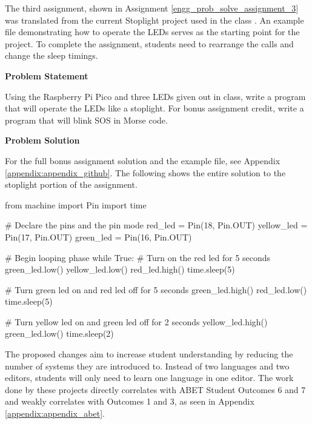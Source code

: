 The third assignment, shown in Assignment \ref{engg_prob_solve_assignment_3} was translated from the 
current Stoplight project used in the class \cite{stoplight}. An example file
demonstrating how to operate the LEDs serves as the starting point for the project. To complete the
assignment, students need to rearrange the  calls and change the sleep timings.

\label{engg_prob_solve_assignment_3}

\begin{tcolorbox}[breakable, enhanced jigsaw, title=DEN 161: Assignment \ref{engg_prob_solve_assignment_3}, 
    colframe=ksu-purple, colback=ksu-gray]

    \textbf{Problem Statement}
    \parindent15pt

    Using the Raspberry Pi Pico and three LEDs given out in class, write a program that will operate
    the LEDs like a stoplight. For bonus assignment credit, write a program that will blink SOS in Morse code.
    
    \tcblower
    \textbf{Problem Solution}
    \parindent15pt
    
    For the full bonus assignment solution and the example file, see Appendix \ref{appendix:appendix_github}. 
    The following shows the entire solution to the stoplight portion of the assignment.

\begin{python}
from machine import Pin
import time

# Declare the pins and the pin mode
red_led = Pin(18, Pin.OUT)
yellow_led = Pin(17, Pin.OUT)
green_led = Pin(16, Pin.OUT)

# Begin looping phase
while True:
    # Turn on the red led for 5 seconds
    green_led.low()
    yellow_led.low()
    red_led.high()
    time.sleep(5)

    # Turn green led on and red led off for 5 seconds
    green_led.high()
    red_led.low()
    time.sleep(5)

    # Turn yellow led on and green led off for 2 seconds
    yellow_led.high()
    green_led.low()
    time.sleep(2)
    \end{python}
\end{tcolorbox}


The proposed changes aim to increase student understanding by reducing the number of systems they are introduced 
to. Instead of two languages and two editors, students will only need to learn one language in one editor. The 
work done by these projects directly correlates with ABET Student Outcomes 6 and 7 and weakly correlates with 
Outcomes 1 and 3, as seen in Appendix \ref{appendix:appendix_abet}.

